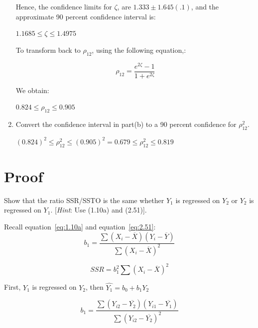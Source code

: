 \documentclass{article}
\begin{document}
\begin{enumerate}[label=(\alph*)]
Hence, the confidence limits for $\zeta$, are $1.333 \pm 1.645 (.1)$, and the approximate 90 percent confidence interval is:

\begin{center}
$1.1685 \leq \zeta \leq 1.4975$
\end{center}

To transform back to $\rho_{12}$, using the following equation,:

\begin{equation}
\rho_{12}=\frac{e^{2\zeta}-1}{1+e^{2\zeta}}
\end{equation}

We obtain:

\begin{center}
$0.824 \leq \rho_{12} \leq 0.905$
\end{center}

\item Convert the confidence interval in part(b) to a 90 percent confidence for $\rho^2_{12}$.

\begin{center}
$(0.824)^2 \leq \rho^2_{12} \leq (0.905)^2=0.679 \leq \rho^2_{12} \leq 0.819$
\end{center}


\end{enumerate}

\newpage
\section{Proof}
Show that the ratio SSR/SSTO is the same whether $Y_{1}$ is regressed on $Y_{2}$ or $Y_{2}$ is regressed on $Y_{1}$. [\emph{Hint}: Use (1.10a) and (2.51)].
\vspace{5mm}

Recall equation~\ref{eq:1.10a} and equation~\ref{eq:2.51}:
\begin{equation} \tag{1.10a}
b_{1}=\frac{\sum (X_{i}-\overline{X})(Y_{i}-\overline{Y})}{\sum(X_{i}-\overline{X})^2}
\label{eq:1.10a}
\end{equation}

\begin{equation} \tag{2.51}
SSR=b^2_{1}\sum (X_{i}-\overline{X})^2
\label{eq:2.51}
\end{equation}

First, $Y_{1}$ is regressed on $Y_{2}$, then $\widehat{Y_{1}}=b_{0}+b_{1}Y_{2}$

\begin{equation} \tag{3.11}
b_{1}=\frac{\sum (Y_{i2}-\overline{Y_{2}})(Y_{i1}-\overline{Y_{1}})}{\sum(Y_{i2}-\overline{Y_{2}})^2}
\end{equation}
\end{document}
